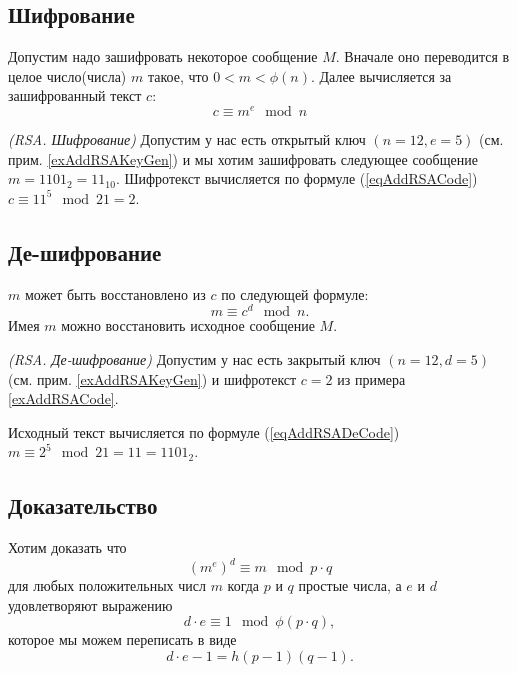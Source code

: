 \subsection{Шифрование}

Допустим надо зашифровать некоторое сообщение $M$. Вначале оно
переводится в целое число(числа) $m$ такое, что 
$0 < m < \phi\left(n\right)$. Далее вычисляется за зашифрованный текст
$c$:
\begin{equation}
c \equiv m^e \mod{n}
\label{eqAddRSACode}
\end{equation}

\begin{example}
\emph{(RSA. Шифрование)}
Допустим у нас есть открытый ключ $\left(n=12, e=5\right)$ (см. прим. \ref{exAddRSAKeyGen}) 
и мы хотим зашифровать следующее сообщение $m = 1101_2 = 11_{10}$. 
Шифротекст вычисляется по формуле (\ref{eqAddRSACode}) $c \equiv 11^5 \mod{21} = 2$.
\label{exAddRSACode}
\end{example}

\subsection{Де-шифрование}

$m$ может быть восстановлено из $c$ по следующей формуле:
\begin{equation}
m \equiv c^d \mod{n}.
\label{eqAddRSADeCode}
\end{equation}
Имея $m$ можно восстановить исходное сообщение $M$.
\begin{example}
\emph{(RSA. Де-шифрование)}
Допустим у нас есть закрытый ключ $\left(n=12, d=5\right)$ (см. прим. \ref{exAddRSAKeyGen}) и шифротекст $c = 2$ из примера \ref{exAddRSACode}.

Исходный текст вычисляется по формуле (\ref{eqAddRSADeCode}) $m \equiv 2^5 \mod{21} = 11 = 1101_2$.
\label{exAddRSADeCode}
\end{example}

\subsection{Доказательство}
Хотим доказать что 
\[
\left(m^e\right)^d \equiv m \mod{p \cdot q}
\]
для любых положительных числ $m$ когда $p$ и $q$ простые числа, а $e$
и $d$ удовлетворяют выражению
\[
d \cdot e \equiv 1 \mod{\phi\left(p \cdot q\right)},
\]
которое мы можем переписать в виде
\[
d \cdot e - 1 = h \left(p - 1\right)\left(q - 1\right).
\]

